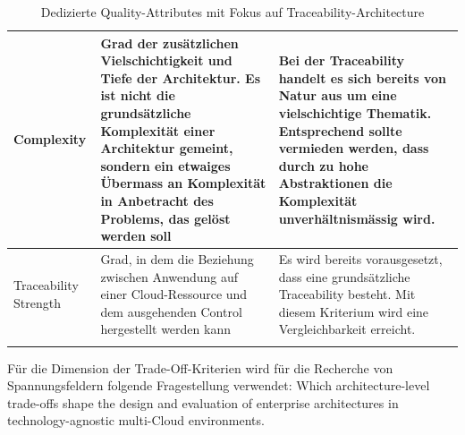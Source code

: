 \begin{longtable}{|
  L{3cm}|
  p{\dimexpr(\textwidth-3cm-6\arrayrulewidth)/2}|
  p{\dimexpr(\textwidth-3cm-6\arrayrulewidth)/2}|
}
    Complexity &
    Grad der zusätzlichen Vielschichtigkeit und Tiefe der Architektur. Es ist nicht die grundsätzliche Komplexität einer Architektur gemeint, sondern ein etwaiges Übermass an Komplexität in Anbetracht des Problems, das gelöst werden soll &
    Bei der Traceability handelt es sich bereits von Natur aus um eine vielschichtige Thematik. Entsprechend sollte vermieden werden, dass durch zu hohe Abstraktionen die Komplexität unverhältnismässig wird.
    \\
    \hline

    Traceability Strength &
    Grad, in dem die Beziehung zwischen Anwendung auf einer Cloud-Ressource und dem ausgehenden Control hergestellt werden kann &
    Es wird bereits vorausgesetzt, dass eine grundsätzliche Traceability besteht. Mit diesem Kriterium wird eine Vergleichbarkeit erreicht.
    \\
    \hline

    \caption{Dedizierte Quality-Attributes mit Fokus auf Traceability-Architecture}
    \label{tab:quality-attributes}
\end{longtable}

  Für die Dimension der Trade-Off-Kriterien wird für die Recherche von Spannungsfeldern folgende Fragestellung verwendet: \flqq Which architecture-level trade-offs shape the design and evaluation of enterprise architectures in technology-agnostic multi-Cloud environments\frqq.

